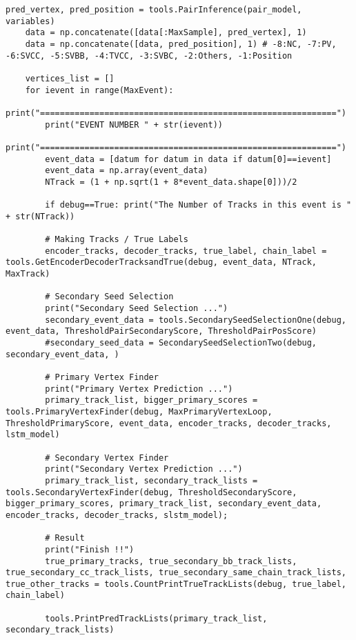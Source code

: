 \begin{lstlisting}[caption=崩壊点検出アルゴリズム, label=VertexFinder2]
    pred_vertex, pred_position = tools.PairInference(pair_model, variables)
    data = np.concatenate([data[:MaxSample], pred_vertex], 1)
    data = np.concatenate([data, pred_position], 1) # -8:NC, -7:PV, -6:SVCC, -5:SVBB, -4:TVCC, -3:SVBC, -2:Others, -1:Position

    vertices_list = []
    for ievent in range(MaxEvent):
        print("============================================================")
        print("EVENT NUMBER " + str(ievent))
        print("============================================================")
        event_data = [datum for datum in data if datum[0]==ievent]
        event_data = np.array(event_data)
        NTrack = (1 + np.sqrt(1 + 8*event_data.shape[0]))/2 
        
        if debug==True: print("The Number of Tracks in this event is " + str(NTrack))

        # Making Tracks / True Labels 
        encoder_tracks, decoder_tracks, true_label, chain_label = tools.GetEncoderDecoderTracksandTrue(debug, event_data, NTrack, MaxTrack)

        # Secondary Seed Selection
        print("Secondary Seed Selection ...")
        secondary_event_data = tools.SecondarySeedSelectionOne(debug, event_data, ThresholdPairSecondaryScore, ThresholdPairPosScore)
        #secondary_seed_data = SecondarySeedSelectionTwo(debug, secondary_event_data, )

        # Primary Vertex Finder 
        print("Primary Vertex Prediction ...")
        primary_track_list, bigger_primary_scores = tools.PrimaryVertexFinder(debug, MaxPrimaryVertexLoop, ThresholdPrimaryScore, event_data, encoder_tracks, decoder_tracks, lstm_model)

        # Secondary Vertex Finder 
        print("Secondary Vertex Prediction ...")
        primary_track_list, secondary_track_lists = tools.SecondaryVertexFinder(debug, ThresholdSecondaryScore, bigger_primary_scores, primary_track_list, secondary_event_data, encoder_tracks, decoder_tracks, slstm_model);

        # Result 
        print("Finish !!")
        true_primary_tracks, true_secondary_bb_track_lists, true_secondary_cc_track_lists, true_secondary_same_chain_track_lists, true_other_tracks = tools.CountPrintTrueTrackLists(debug, true_label, chain_label)
        
        tools.PrintPredTrackLists(primary_track_list, secondary_track_lists)


\end{lstlisting}
